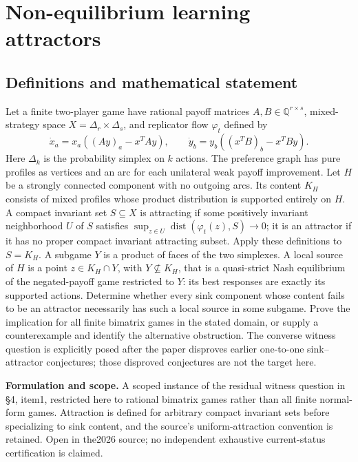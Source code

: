 \documentclass[11pt]{article}
\begin{document}
\section*{Non-equilibrium learning attractors}\label{30007566}
\subsection{Definitions and mathematical statement}
Let a finite two-player game have rational payoff matrices \(A,B\in\mathbb Q^{r\times s}\), mixed-strategy space \(X=\Delta_r\times\Delta_s\), and replicator flow \(\varphi_t\) defined by
\[
 \dot x_a=x_a((Ay)_a-x^TAy),\qquad
 \dot y_b=y_b((x^TB)_b-x^TBy).
\]
Here \(\Delta_k\) is the probability simplex on \(k\) actions. The preference graph has pure profiles as vertices and an arc for each unilateral weak payoff improvement. Let \(H\) be a strongly connected component with no outgoing arcs. Its content \(K_H\) consists of mixed profiles whose product distribution is supported entirely on \(H\). A compact invariant set \(S\subseteq X\) is attracting if some positively invariant neighborhood \(U\) of \(S\) satisfies \(\sup_{z\in U}\operatorname{dist}(\varphi_t(z),S)\to0\); it is an attractor if it has no proper compact invariant attracting subset. Apply these definitions to \(S=K_H\). A subgame \(Y\) is a product of faces of the two simplexes. A local source of \(H\) is a point \(z\in K_H\cap Y\), with \(Y\not\subseteq K_H\), that is a quasi-strict Nash equilibrium of the negated-payoff game restricted to \(Y\): its best responses are exactly its supported actions. Determine whether every sink component whose content fails to be an attractor necessarily has such a local source in some subgame. Prove the implication for all finite bimatrix games in the stated domain, or supply a counterexample and identify the alternative obstruction. The converse witness question is explicitly posed after the paper disproves earlier one-to-one sink–attractor conjectures; those disproved conjectures are not the target here.

\par\textbf{Formulation and scope.} A scoped instance of the residual witness question in §4, item1, restricted here to rational bimatrix games rather than all finite normal-form games. Attraction is defined for arbitrary compact invariant sets before specializing to sink content, and the source’s uniform-attraction convention is retained. Open in the2026 source; no independent exhaustive current-status certification is claimed.
\end{document}
